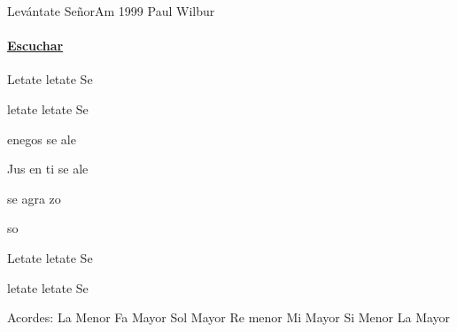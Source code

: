 \documentclass[12pt, spanish]{book}
\newcommand{\NotCCLIed}{\relax}
\begin{document}
    \begin{song}{Levántate Señor}{Am}
    {1999} %
    {Paul Wilbur}
    {} %
    {} %
        \ifChordBk
            \paragraph{\mbox{}\hfill\protect\href{https://open.spotify.com/intl-es/track/7yK53SBiG1AyKG6yGTDbdT}{Escuchar}\mbox{}\hfill}
        \fi


        \begin{SBOpGroup}
            Letate letate Se

            letate letate Se 
        \end{SBOpGroup}

        \begin{SBChorus}
             enegos se ale

             Jus en ti se ale

             se agra  zo

            so   
        \end{SBChorus}


        \begin{SBOpGroup}
            Letate letate Se

            letate letate Se 
        \end{SBOpGroup}

        \ifChordBk
        \begin{SBOpGroup}
            Acordes:\break
            \upchord{\Am}\qquad La Menor \hfill
            \upchord{\F}\qquad Fa Mayor \hfill\null\break
            \upchord{\G}\qquad Sol Mayor \hfill
            \upchord{\Dm}Re menor \hfill\null\break
            \upchord{\E}\qquad Mi Mayor \hfill
            \upchord{\Bm}\qquad Si Menor \hfill\null\break
            \upchord{\A}\qquad La Mayor \hfill\null\break
        \end{SBOpGroup}
        \fi
    \end{song}
\end{document}
